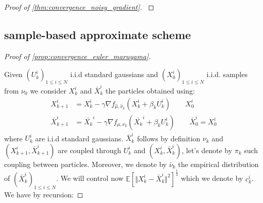 \begin{proof}[Proof of \cref{thm:convergence_noisy_gradient}]\label{proof:thm:convergence_noisy_gradient}
\end{proof}





\subsection{sample-based approximate scheme}
\begin{proof}[Proof of \cref{prop:convergence_euler_maruyama}]\label{proof:propagation_chaos}

Given $(U_{k}^{i})_{1\leq i\leq N}$ i.i.d standard gaussians and $(X_{0}^{i})_{1\leq i\leq N}$ i.i.d. samples from $\nu_0$ we consider $X_k^i$ and $\bar{X}_{k}^{i}$  the particles obtained using:
\begin{align}
X_{k+1}^{i}&=X_{k}^{i}-\gamma\nabla f_{\hat{\mu},\hat{\nu}_{k}}(X_{k}^{i}+\beta_{k}U_{k}^{i})\qquad X_0^i  \\
\bar{X}_{k+1}^{i}&=\bar{X_{k}}^{i}-\gamma\nabla f_{\mu,\nu_{k}}(\bar{X_{k}}^{i}+\beta_{k}U_{k}^{i})\qquad \bar{X}_{0}^{i}=X_{0}^{i}
\end{align}
where $U_{k}^{i}$ are i.i.d standard gaussians. $\bar{X}_{k}^{i}$ follows by definition $\nu_{k}$ and $(X_{k+1}^{i},\bar{X}_{k+1}^{i})$
are coupled through $U_{k}^{i}$ and $(X_{k}^{i},\bar{X}_{k}^{i})$,
let's denote by $\pi_{k}$ such coupling between particles. Moreover,
we denote by $\bar{\nu}_{k}$ the empirical distribution of $(\bar{X}_{k}^{i})_{1\leq i\leq N}$.
We will control now $\mathbb{E}\left[\Vert X_{k}^{i}-\bar{X}_{k}^{i}\Vert^{2}\right]^{\frac{1}{2}}$
which we denote by $c_{k}^{i}$. We have by recursion:


\end{proof}
